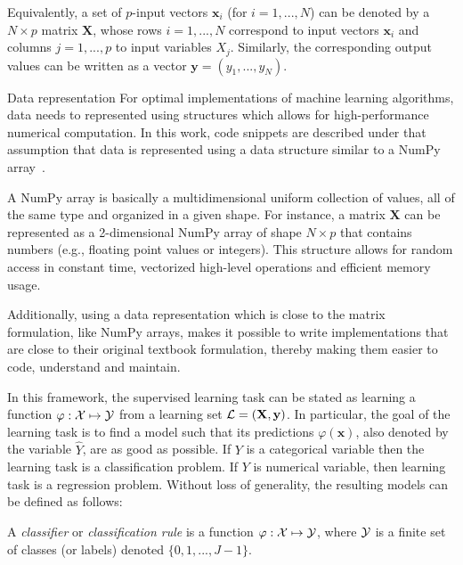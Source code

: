 Equivalently, a set of $p$-input vectors $\mathbf{x}_i$ (for $i=1, ..., N$) can
be denoted by a $N\times p$ matrix $\mathbf{X}$, whose rows $i=1, ..., N$
correspond to input vectors $\mathbf{x}_i$ and columns $j=1, ..., p$ to input
variables $X_j$. Similarly, the corresponding output values can be written as a
vector $\mathbf{y}=(y_1, ..., y_N)$.

\begin{remark}{Data representation}
For optimal implementations of machine learning algorithms, data needs to
represented using structures which allows for high-performance numerical
computation. In this work, code snippets are described under  that assumption
that data is represented using a data structure similar to a NumPy
array~\citep{vanderwalt:2011}.

A NumPy array is basically a multidimensional uniform collection of values, all
of the same type and organized in a given shape. For instance, a matrix
$\mathbf{X}$ can be represented as a 2-dimensional NumPy array of shape $N
\times p$ that contains numbers (e.g., floating point values or integers). This
structure allows for random access in constant time, vectorized high-level
operations and efficient memory usage.

Additionally, using a data representation which is close to the matrix
formulation, like NumPy arrays, makes it possible to write implementations that
are close to their original textbook formulation, thereby making them easier to code,
understand and maintain. \end{remark}

In this framework, the supervised learning task can be stated as learning a
function $\varphi: {\cal X} \mapsto {\cal Y}$ from a learning set ${\cal
L}=(\mathbf{X}, \mathbf{y})$. In particular, the goal of the learning task is
to find a model such that its predictions $\varphi(\mathbf{x})$, also denoted
by the variable $\hat{Y}$, are as good as possible. If $Y$ is a categorical
variable then the learning task is a classification problem. If $Y$ is
numerical variable, then learning task is a regression problem. Without loss of
generality, the resulting models can be defined as
follows:

\begin{definition}
A \emph{classifier} or \emph{classification rule} is a function $\varphi: {\cal X}
\mapsto {\cal Y}$, where ${\cal Y}$ is a finite set of classes (or labels) denoted $\{0, 1, ..., J-1\}$.
\end{definition}

